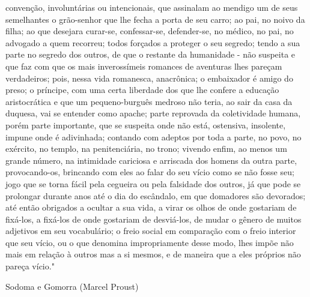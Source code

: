 {convenção, involuntárias ou intencionais, que assinalam ao mendigo um de seus semelhantes o grão-senhor que lhe fecha a porta de seu carro; ao pai, no noivo da filha; ao que desejara curar-se, confessar-se, defender-se, no médico, no pai, no advogado a quem recorreu; todos forçados a proteger o seu segredo; tendo a sua parte no segredo dos outros, de que o restante da humanidade - não suspeita e que faz com que os mais inverossímeis romances de aventuras lhes pareçam verdadeiros; pois, nessa vida romanesca, anacrônica; o embaixador é amigo do preso; o príncipe, com uma certa liberdade dos que lhe confere a educação aristocrática e que um pequeno-burguês medroso não teria, ao sair da casa da duquesa, vai se entender como apache; parte reprovada da coletividade humana, porém parte importante, que se suspeita onde não está, ostensiva, insolente, impune onde é adivinhada; contando com adeptos por toda a parte, no povo, no exército, no templo, na penitenciária, no trono; vivendo enfim, ao menos um grande número, na intimidade cariciosa e arriscada dos homens da outra parte, provocando-os, brincando com eles ao falar do seu vício como se não fosse seu; jogo que se torna fácil pela cegueira ou pela falsidade dos outros, já que pode se prolongar durante anos até o dia do escândalo, em que domadores são devorados; até então obrigados a ocultar a sua vida, a virar os olhos de onde gostariam de fixá-los, a fixá-los de onde gostariam de desviá-los, de mudar o gênero de muitos adjetivos em seu vocabulário; o freio social em comparação com o freio interior que seu vício, ou o que denomina impropriamente desse modo, lhes impõe não mais em relação à outros mas a si mesmos, e de maneira que a eles próprios não pareça vício."

Sodoma e Gomorra (Marcel Proust)
}





